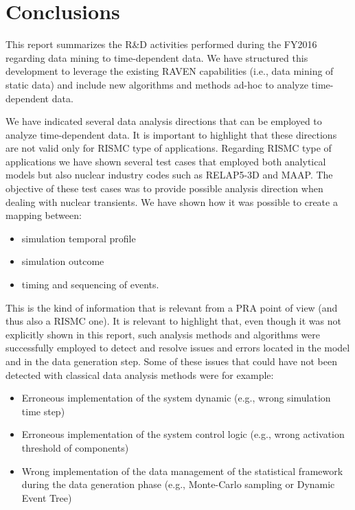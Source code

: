 \section{Conclusions}
\label{sec:conclusions}

This report summarizes the R&D activities performed during the FY2016 regarding 
data mining to time-dependent data. We have structured this development to 
leverage the existing RAVEN capabilities (i.e., data mining of static data) and 
include new algorithms and methods ad-hoc to analyze time-dependent data.

We have indicated several data analysis directions that can be employed to analyze 
time-dependent data. It is important to highlight that these directions are not valid 
only for RISMC type of applications. Regarding RISMC type of applications we have shown 
several test cases that employed both analytical models but also nuclear industry codes 
such as RELAP5-3D and MAAP.
The objective of these test cases was to provide possible analysis direction when 
dealing with nuclear transients. We have shown how it was possible to create a mapping 
between:
\begin{itemize}
  \item simulation temporal profile
  \item simulation outcome
  \item timing and sequencing of events. 
\end{itemize}

This is the kind of information that is relevant from a PRA point of view (and thus 
also a RISMC one).
It is relevant to highlight that, even though it was not explicitly shown in this report, 
such analysis methods and algorithms were successfully employed to detect and resolve 
issues and errors located in the model and in the data generation step. 
Some of these issues that could have not been detected with classical data analysis methods 
were for example:
\begin{itemize}
  \item Erroneous implementation of the system dynamic (e.g., wrong simulation time step)
  \item Erroneous implementation of the system control logic (e.g., wrong activation threshold 
        of components)
  \item Wrong implementation of the data management of the statistical framework during the 
        data generation phase (e.g., Monte-Carlo sampling or Dynamic Event Tree)
\end{itemize}

